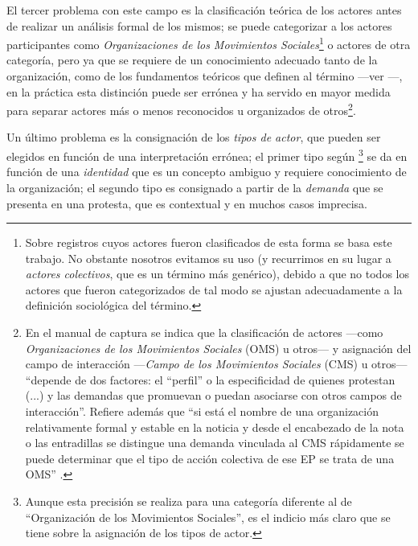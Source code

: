 \documentclass[letterpaper, 11pt]{book}
\theoremstyle{definition}
\theoremstyle{remark}
\begin{document}
\begin{enumerate}
    El tercer problema con este campo es la clasificación teórica de los actores antes de realizar un análisis formal de los mismos; se puede categorizar a los actores participantes como \emph{Organizaciones de los Movimientos Sociales}\footnote{
    Sobre registros cuyos actores fueron clasificados de esta forma se basa este trabajo. 
    No obstante nosotros evitamos su uso (y recurrimos en su lugar a \emph{actores colectivos}, que es un término más genérico), debido a que no todos los actores que fueron categorizados de tal modo se ajustan adecuadamente a la definición sociológica del término.} o actores de otra categoría, pero ya que se requiere de un conocimiento adecuado tanto de la organización, como de los fundamentos teóricos que definen al término ---ver ---, en la práctica esta distinción puede ser errónea y ha servido en mayor medida para separar actores más o menos reconocidos u organizados de otros\footnote{
    En el manual de captura se indica que la clasificación de actores ---como \emph{Organizaciones de los Movimientos Sociales} (OMS) u otros--- y asignación del campo de interacción ---\emph{Campo de los Movimientos Sociales} (CMS) u otros--- ``depende de dos factores: el ``perfil'' o la especificidad de quienes protestan (...) y las demandas que promuevan o puedan asociarse con otros campos de interacción''. 
    Refiere además que ``si está el nombre de una organización relativamente formal y estable en la noticia y desde el encabezado de la nota o las entradillas se distingue una demanda vinculada al CMS rápidamente se puede determinar que el tipo de acción colectiva de ese EP se trata de una OMS'' \citep[17]{2017_Cadena_ManualLAOMS}.}. 
    
    Un último problema es la consignación de los \emph{tipos de actor}, que pueden ser elegidos en función de una interpretación errónea; el primer tipo según \citet{2017_Cadena_ManualLAOMS}\footnote{
    Aunque esta precisión se realiza para una categoría diferente al de ``Organización de los Movimientos Sociales'', es el indicio más claro que se tiene sobre la asignación de los tipos de actor.} se da en función de una \emph{identidad} que es un concepto ambiguo y requiere conocimiento de la organización; el segundo tipo es consignado a partir de la \emph{demanda} que se presenta en una protesta, que es contextual y en muchos casos imprecisa.



\end{enumerate}
\end{document}
